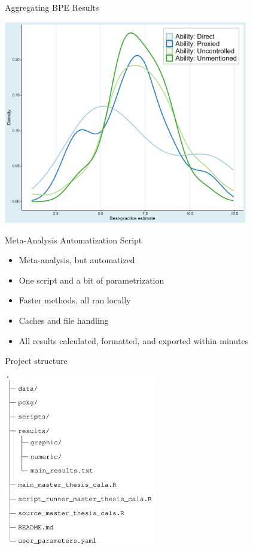 \documentclass{beamer} %
\begin{document}
\begin{frame}{Aggregating BPE Results}
    \begin{center}
        \includegraphics[width=0.8\textwidth]{Figures/bpe_ability.png}
    \end{center}
\end{frame}


\begin{frame}{Meta-Analysis Automatization Script}

    \begin{itemize}
        \item Meta-analysis, but automatized
        \item One script and a bit of parametrization
        \item Faster methods, all ran locally
        \item Caches and file handling
        \item All results calculated, formatted, and exported within minutes
    \end{itemize}

\end{frame}


\begin{frame}{Project structure}

    \begin{flushleft}
        \includegraphics[width=0.5\textwidth]{Figures/project_structure.png}
    \end{flushleft}

\end{frame}
\end{document}
